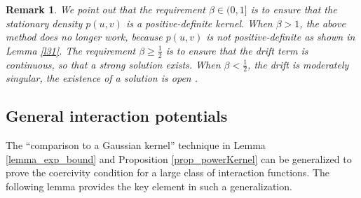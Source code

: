 \documentclass[]{elsarticle}
\newtheorem{remark}[theorem]{Remark}
\numberwithin{equation}{section}
\numberwithin{theorem}{section}
\begin{document}
\begin{remark}
We point out that the requirement $\beta \in (0,1]$ is to ensure that the stationary density $p(u,v)$ is a positive-definite kernel. When $\beta >1$, the above method does no longer work, because $p(u,v)$ is not positive-definite as shown in Lemma {\rm \ref{l31}}. The requirement $\beta \geq \frac{1}{2}$ is to ensure that the drift term is continuous, so that a strong solution exists. When $\beta <\frac{1}{2}$, the drift is moderately singular, the existence of a solution is open {\rm \cite{skorokhod1996_RegularityManyparticle,albeverio2003_StrongFeller}}.  
\end{remark}

\subsection{General interaction potentials}\label{sec:genFn}
The ``comparison to a Gaussian kernel'' technique in Lemma \ref{lemma_exp_bound} and Proposition \ref{prop_powerKernel} can be generalized to prove the coercivity condition for a large class of interaction functions. The following lemma provides the key element in such a generalization. 
\end{document}
